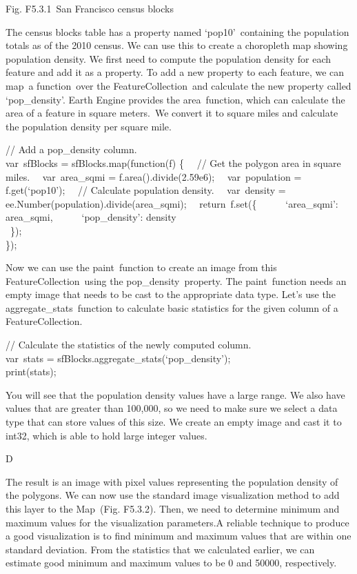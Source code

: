 \documentclass[
  letterpaper,
  DIV=11,
  numbers=noendperiod]{scrreprt}
\begin{document}
Fig. F5.3.1~San Francisco census blocks

The census blocks table has a property named `pop10'~containing the
population totals as of the 2010 census. We can use this to create a
choropleth map showing population density. We first need to compute the
population density for each feature and add it as a property. To add a
new property to each feature, we can map~a function~over the
FeatureCollection~and calculate the new property called `pop\_density'.
Earth Engine provides the area~function, which can calculate the area of
a feature in square meters.~We convert it to square miles and calculate
the population density per square mile.

// Add a pop\_density column.\\
var~sfBlocks = sfBlocks.map(function(f) \{~ ~// Get the polygon area in
square miles.~ ~var~area\_sqmi = f.area().divide(2.59e6);~
~var~population = f.get(`pop10');~ ~// Calculate population density.~
~var~density = ee.Number(population).divide(area\_sqmi);~
~return~f.set(\{~ ~ ~ ~`area\_sqmi': area\_sqmi,~ ~ ~ ~`pop\_density':
density\\
\hspace*{0.333em} ~\});\\
\});

Now we can use the paint~function to create an image from this
FeatureCollection~using the pop\_density~property. The paint~function
needs an empty image that needs to be cast to the appropriate data type.
Let's use the aggregate\_stats~function to calculate basic statistics
for the given column of a FeatureCollection.

// Calculate the statistics of the newly computed column.\\
var~stats = sfBlocks.aggregate\_stats(`pop\_density');\\
print(stats);

You will see that the population density values have a large range. We
also have values that are greater than 100,000, so we need to make sure
we select a data type that can store values of this size. We create an
empty image and cast it to int32, which is able to hold large integer
values.

D

The result is an image with pixel values representing the population
density of the polygons. We can now use the standard image visualization
method to add this layer to the Map~(Fig. F5.3.2). Then, we need to
determine minimum and maximum values for the visualization parameters.A
reliable technique to produce a good visualization is to find minimum
and maximum values that are within one standard deviation. From the
statistics that we calculated earlier, we can estimate good minimum and
maximum values to be 0 and 50000, respectively.
\end{document}
